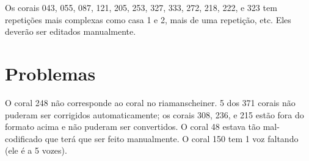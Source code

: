\documentclass[12pt,brazil]{book}
\begin{document}
Os corais 043, 055, 087, 121, 205, 253, 327, 333, 272, 218, 222, e 323
tem repetições mais complexas como casa 1 e 2, mais de uma repetição,
etc. Eles deverão ser editados manualmente.

\section{Problemas}
\label{sec:problemas}

O coral 248 não corresponde ao coral no riamanscheiner. 5 dos 371
corais não puderam ser corrigidos automaticamente; os corais 308, 236,
e 215 estão fora do formato acima e não puderam ser convertidos. O
coral 48 estava tão mal-codificado que terá que ser feito manualmente.
O coral 150 tem 1 voz faltando (ele é a 5 vozes).
\end{document}
